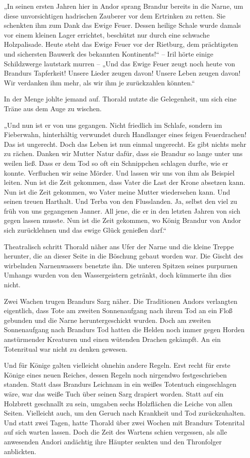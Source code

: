 „In seinen ersten Jahren hier in Andor sprang Brandur bereits in die Narne, um diese unvorsichtigen hadrischen Zauberer vor dem Ertrinken zu retten. Sie schenkten ihm zum Dank das Ewige Feuer. Dessen heilige Schale wurde damals vor einem kleinen Lager errichtet, beschützt nur durch eine schwache Holzpalisade. Heute steht das Ewige Feuer vor der Rietburg, dem prächtigsten und sichersten Bauwerk des bekannten Kontinents!“ – Iril hörte einige Schildzwerge lautstark murren – „Und das Ewige Feuer zeugt noch heute von Brandurs Tapferkeit! Unsere Lieder zeugen davon! Unsere Leben zeugen davon! Wir verdanken ihm mehr, als wir ihm je zurückzahlen könnten.“

In der Menge johlte jemand auf. Thorald nutzte die Gelegenheit, um sich eine Träne aus dem Auge zu wischen.

„Und nun ist er von uns gegangen. Nicht friedlich im Schlafe, sondern im Fieberwahn, hinterhältig verwundet durch Handlanger eines feigen Feuerdrachen! Das ist ungerecht. Doch das Leben ist nun einmal ungerecht. Es gibt nichts mehr zu rächen. Danken wir Mutter Natur dafür, dass sie Brandur so lange unter uns weilen ließ. Dass er dem Tod so oft ein Schnippchen schlagen durfte, wie er konnte. Verfluchen wir seine Mörder. Und lassen wir uns von ihm als Beispiel leiten. Nun ist die Zeit gekommen, dass Vater die Last der Krone absetzen kann. Nun ist die Zeit gekommen, wo Vater meine Mutter wiedersehen kann. Und seinen treuen Harthalt. Und Terba von den Flusslanden. Ja, selbst den viel zu früh von uns gegangenen Janner. All jene, die er in den letzten Jahren von sich gegen lassen musste. Nun ist die Zeit gekommen, wo König Brandur von Andor sich zurücklehnen und das ewige Glück genießen darf.“

Theatralisch schritt Thorald näher ans Ufer der Narne und die kleine Treppe herunter, die an dieser Seite in die Böschung gebaut worden war. Die Gischt des wirbelnden Narnenwassers benetzte ihn. Die unteren Spitzen seines purpurnen Umhangs wurden von den Wassergeistern getränkt, doch kümmerte ihn dies nicht.

Zwei Wachen trugen Brandurs Sarg näher. Die Traditionen Andors verlangten eigentlich, dass Tote am zweiten Sonnenaufgang nach ihrem Tod an ein Floß gebunden und die Narne heruntergeschickt wurden. Doch am zweiten Sonnenaufgang nach Brandurs Tod hatten die Helden noch immer gegen Horden anstürmender Kreaturen und einen wütenden Drachen gekämpft. An ein Totenritual war nicht zu denken gewesen.

Und für Könige galten vielleicht ohnehin andere Regeln. Erst recht für erste Könige eines neuen Reiches, dessen Regeln noch nirgendwo festgeschrieben standen. Statt dass Brandurs Leichnam in ein weißes Totentuch eingeschlagen wäre, war das weiße Tuch über seinen Sarg drapiert worden. Statt auf ein Holzbrett geschnallt zu sein, umgaben sechs Holzflächen die Leiche von allen Seiten. Vielleicht auch, um den Geruch nach Krankheit und Tod zurückzuhalten. Und statt zwei Tagen, hatte Thorald über zwei Wochen mit Brandurs Totenrital auf sich warten lassen. Doch die Zeit des Wartens schien vergessen, als alle anwesenden Andori andächtig ihre Häupter senkten und den Thronfolger anblickten.


